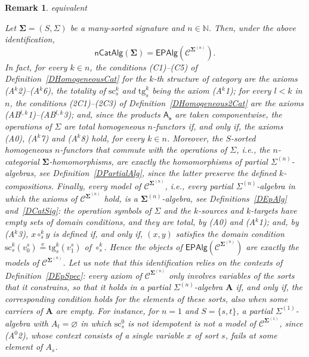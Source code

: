 \documentclass[a4paper, reqno]{amsbook}
\makeatletter
\newcommand{\sig}[1]{\mathbf{#1}}             %
\newcommand{\spec}[1]{\boldsymbol{\mathcal{#1}}} %
\newcommand{\eeq}{\overset{\mathrm e}{=}}      %
\newcommand{\src}{\mathrm{sc}}
\newcommand{\tgt}{\mathrm{tg}}
\theoremstyle{plain}
\newtheorem{remark}[theorem]{Remark}
\theoremstyle{definition}
\newcommand*{\CA@leanpending}{}
\newcommand*{\CA@leanrelation}{}
\newcommand*{\lean}[2]{%
  \ifcsname\string\color@lean@#1\endcsname\else
    \PackageError{main}{Unknown relation `#1' in \string\lean}{Use equivalent, weaker or stronger.}%
  \fi
  \gdef\CA@leanrelation{#1}%
  \gdef\CA@leanpending{#2}}
\makeatother
\begin{document}
\begin{remark}\label{RCatAlgAsEpAlg}\lean{equivalent}{Homogeneous.modelIsomorphism}
Let $\sig{\Sigma}=(S,\Sigma)$ be a many-sorted signature and $n\in\mathbb{N}$.
Then, under the above identification,
$$
\mathsf{nCatAlg}(\sig{\Sigma})=\mathsf{EPAlg}(\spec{C}^{\sig{\Sigma}^{(n)}}).
$$
In fact, for every $k\in n$, the conditions (C1)--(C5) of Definition~\ref{DHomogeneousCat} for the $k$-th structure of category are the axioms (A$^{k}$2)--(A$^{k}$6), the totality of $\src^{k}_{s}$ and $\tgt^{k}_{s}$ being the axiom (A$^{k}$1); for every $l<k$ in $n$, the conditions (2C1)--(2C3) of Definition~\ref{DHomogeneous2Cat} are the axioms (AB$^{l,k}$1)--(AB$^{l,k}$3); and, since the products $\mathsf{A}_{\mathbf{s}}$ are taken componentwise, the operations of $\Sigma$ are total homogeneous $n$-functors if, and only if, the axioms (A0), (A$^{k}$7) and (A$^{k}$8) hold, for every $k\in n$.
Moreover, the $S$-sorted homogeneous $n$-functors that commute with the operations of $\Sigma$, i.e., the $n$-categorial $\sig{\Sigma}$-homomorphisms, are exactly the homomorphisms of partial $\Sigma^{(n)}$-algebras, see Definition~\ref{DPartialAlg}, since the latter preserve the defined $k$-compositions.
Finally, every model of $\spec{C}^{\sig{\Sigma}^{(n)}}$, i.e., every partial $\Sigma^{(n)}$-algebra in which the axioms of $\mathcal{C}^{\sig{\Sigma}^{(n)}}$ hold, is a $\sig{\Sigma}^{(n)}$-algebra, see Definitions~\ref{DEpAlg} and~\ref{DCatSig}: the operation symbols of $\Sigma$ and the $k$-sources and $k$-targets have empty sets of domain conditions, and they are total, by (A0) and (A$^{k}$1); and, by (A$^{k}$3), $x\circ^{k}_{s}y$ is defined if, and only if, $(x,y)$ satisfies the domain condition $\src^{k}_{s}(v^{s}_{0})\eeq\tgt^{k}_{s}(v^{s}_{1})$ of $\circ^{k}_{s}$.
Hence the objects of $\mathsf{EPAlg}(\spec{C}^{\sig{\Sigma}^{(n)}})$ are exactly the models of $\spec{C}^{\sig{\Sigma}^{(n)}}$.
Let us note that this identification relies on the contexts of Definition~\ref{DEpSpec}: every axiom of $\mathcal{C}^{\sig{\Sigma}^{(n)}}$ only involves variables of the sorts that it constrains, so that it holds in a partial $\Sigma^{(n)}$-algebra $\mathbf{A}$ if, and only if, the corresponding condition holds for the elements of these sorts, also when some carriers of $\mathbf{A}$ are empty.
For instance, for $n=1$ and $S=\{s,t\}$, a partial $\Sigma^{(1)}$-algebra with $A_{t}=\varnothing$ in which $\src^{0}_{s}$ is not idempotent is not a model of $\spec{C}^{\sig{\Sigma}^{(1)}}$, since (A$^{0}$2), whose context consists of a single variable $x$ of sort $s$, fails at some element of $A_{s}$.
\end{remark}
\end{document}
